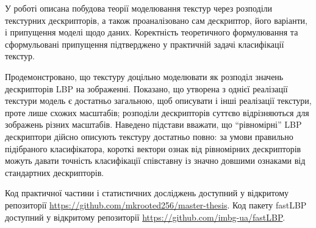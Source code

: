 У роботі описана побудова теорії моделювання текстур через розподіли текстурних дескрипторів,
а також проаналізовано сам дескриптор, його варіанти, і припущення моделі щодо даних.
Коректність теоретичного формулювання та сформульовані припущення підтверджено 
у практичній задачі класифікації текстур.

Продемонстровано, що текстуру доцільно моделювати як розподіл значень дескрипторів LBP на зображенні.
Показано, що утворена з однієї реалізації текстури модель є достатньо загальною, 
щоб описувати і інші реалізації текстури, проте лише схожих масштабів; 
розподіли дескрипторів суттєво відрізняються для зображень різних масштабів.
Наведено підстави вважати, що ``рівномірні'' LBP дескриптори дійсно описують текстуру достатньо повно: 
за умови правильно підібраного класифікатора, короткі вектори ознак від рівномірних дескрипторів можуть 
давати точність класифікації співставну із значно довшими ознаками від стандартних дескрипторів. 

Код практичної частини і статистичних досліджень доступний у відкритому репозиторії \url{https://github.com/mkrooted256/master-thesis}.
Код пакету fastLBP доступний у відкритому репозиторії \url{https://github.com/imbg-ua/fastLBP}.
